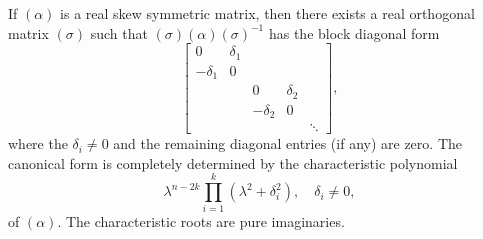 If $(\alpha)$ is a real skew symmetric matrix, then there exists a real orthogonal matrix $(\sigma)$ such that $(\sigma)(\alpha)(\sigma)^{-1}$ has the block diagonal form
$$\begin{bmatrix}
0 & \delta_1 \\
-\delta_1 & 0 \\
& & 0 & \delta_2 \\
& & -\delta_2 & 0 \\
& & & & \ddots
\end{bmatrix},$$
where the $\delta_i \neq 0$ and the remaining diagonal entries (if any) are zero. The canonical form is completely determined by the characteristic polynomial
$$\lambda^{n-2k} \prod_{i=1}^{k} (\lambda^2 + \delta_i^2), \quad \delta_i \neq 0,$$
of $(\alpha)$. The characteristic roots are pure imaginaries.
